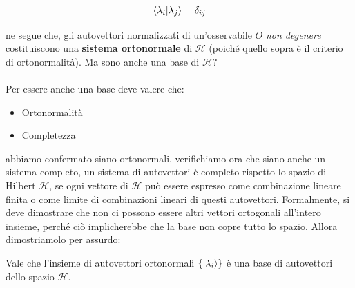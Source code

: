 \begin{align*}
	\braket{\lambda_i}{\lambda_j} = \delta_{ij}
\end{align*}

	ne segue che, gli autovettori normalizzati di un'osservabile $O$ \textit{non degenere} costituiscono una \textbf{sistema ortonormale} di $\mathcal{H}$ (poiché quello sopra è il criterio di ortonormalità). Ma sono anche una base di $\mathcal{H}$?
	\\
	\\
	Per essere anche una base deve valere che:

\begin{itemize}
	\item Ortonormalità
	\item Completezza
\end{itemize}
	
	abbiamo confermato siano ortonormali, verifichiamo ora che siano anche un sistema completo, un sistema di autovettori è completo rispetto lo spazio di Hilbert $\mathcal{H}$, se ogni vettore di $\mathcal{H}$ può essere espresso come combinazione lineare finita o come limite di combinazioni lineari di questi autovettori. Formalmente, si deve dimostrare che non ci possono essere altri vettori ortogonali all'intero insieme, perché ciò implicherebbe che la base non copre tutto lo spazio. Allora dimostriamolo per assurdo:

\begin{myth}
	Vale che l'insieme di autovettori ortonormali $\qty{\ket{\lambda_i}}$ è una base di autovettori dello spazio $\mathcal{H}$.
\end{myth}


